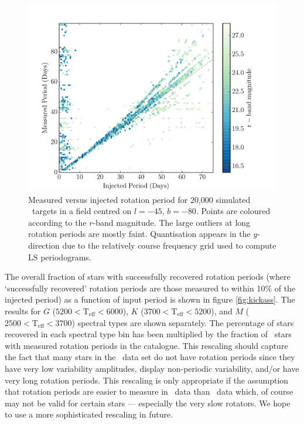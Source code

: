 \begin{figure}
\begin{center}
\includegraphics[width=6in, clip=true]{figures/pvp_r_-80.pdf}
\caption[\LSST\ rotation period recovery results with magnitude dependence]
{Measured versus injected rotation period for 20,000 simulated \LSST\ targets
in a field centred on $l=-45$, $b=-80$.
Points are coloured according to the $r$-band magnitude.
The large outliers at long rotation periods are mostly faint.
Quantisation appears in the $y$-direction due to the relatively course
frequency grid used to compute LS periodograms.}
\label{fig:derek2}
\end{center}
\end{figure}

The overall fraction of stars with successfully recovered rotation periods
(where `successfully recovered' rotation periods are those measured to within
10\% of the injected period) as a function of input period is shown in figure
\ref{fig:kickass}.
The results for $G$ ($5200<\mathrm{T}_{\mathrm{eff}}<6000$), $K$
($3700<\mathrm{T}_{\mathrm{eff}}<5200$), and $M$
($2500<\mathrm{T}_{\mathrm{eff}}<3700$) spectral types are shown separately.
The percentage of stars recovered in each spectral type bin has been
multiplied by the fraction of \kepler\ stars with measured rotation
periods in the \citet{Mcquillan2014} catalogue.
This rescaling should capture the fact that many stars in the \kepler\ data
set do not have rotation periods since they have very low variability
amplitudes, display non-periodic variability, and/or have very long rotation
periods.
This rescaling is only appropriate if the assumption that rotation periods are
easier to measure in \kepler\ data than \LSST\ data which, of course may not
be valid for certain stars --- especially the very slow rotators.
We hope to use a more sophisticated rescaling in future.

